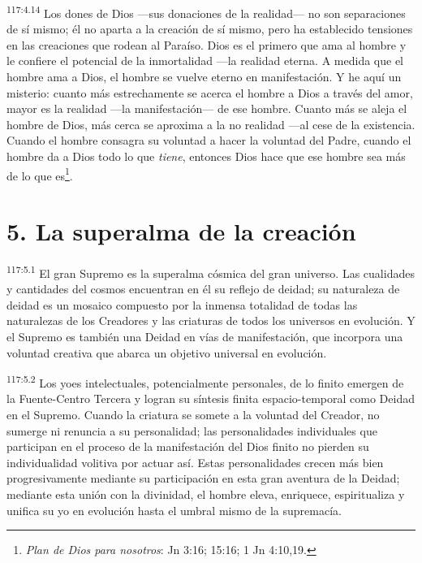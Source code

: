 \par
\textsuperscript{117:4.14} Los dones de Dios ---sus donaciones de la realidad--- no son separaciones de sí mismo; él no aparta a la creación de sí mismo, pero ha establecido tensiones en las creaciones que rodean al Paraíso. Dios es el primero que ama al hombre y le confiere el potencial de la inmortalidad ---la realidad eterna. A medida que el hombre ama a Dios, el hombre se vuelve eterno en manifestación. Y he aquí un misterio: cuanto más estrechamente se acerca el hombre a Dios a través del amor, mayor es la realidad ---la manifestación--- de ese hombre. Cuanto más se aleja el hombre de Dios, más cerca se aproxima a la no realidad ---al cese de la existencia. Cuando el hombre consagra su voluntad a hacer la voluntad del Padre, cuando el hombre da a Dios todo lo que \textit{tiene}, entonces Dios hace que ese hombre sea más de lo que es\footnote{\textit{Plan de Dios para nosotros}: Jn 3:16; 15:16; 1 Jn 4:10,19.}.

\section*{5. La superalma de la creación}
\par
\textsuperscript{117:5.1} El gran Supremo es la superalma cósmica del gran universo. Las cualidades y cantidades del cosmos encuentran en él su reflejo de deidad; su naturaleza de deidad es un mosaico compuesto por la inmensa totalidad de todas las naturalezas de los Creadores y las criaturas de todos los universos en evolución. Y el Supremo es también una Deidad en vías de manifestación, que incorpora una voluntad creativa que abarca un objetivo universal en evolución.

\par
\textsuperscript{117:5.2} Los yoes intelectuales, potencialmente personales, de lo finito emergen de la Fuente-Centro Tercera y logran su síntesis finita espacio-temporal como Deidad en el Supremo. Cuando la criatura se somete a la voluntad del Creador, no sumerge ni renuncia a su personalidad; las personalidades individuales que participan en el proceso de la manifestación del Dios finito no pierden su individualidad volitiva por actuar así. Estas personalidades crecen más bien progresivamente mediante su participación en esta gran aventura de la Deidad; mediante esta unión con la divinidad, el hombre eleva, enriquece, espiritualiza y unifica su yo en evolución hasta el umbral mismo de la supremacía.


